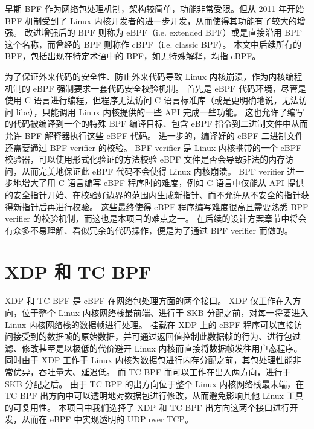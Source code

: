 早期 BPF 作为网络包处理机制，架构较简单，功能非常受限。但从 2011 年开始 BPF 机制受到了 Linux 内核开发者的进一步开发，从而使得其功能有了较大的增强。
改进增强后的 BPF 则称为 eBPF（i.e. extended BPF）或是直接沿用 BPF 这个名称，而曾经的 BPF 则称作 cBPF（i.e. classic BPF）。\cite{10.1145/3371038}
本文中后续所有的 BPF，包括出现在特定术语中的 BPF，如无特殊解释，均指 eBPF。

为了保证外来代码的安全性、防止外来代码导致 Linux 内核崩溃，作为内核编程机制的 eBPF 强制要求一套代码安全校验机制。
首先是 eBPF 代码环境，尽管是使用 C 语言进行编程，但程序无法访问 C 语言标准库（或是更明确地说，无法访问 libc），只能调用 Linux 内核提供的一些 API 完成一些功能。
这也允许了编写的代码被编译到一个的特殊 BPF 编译目标、包含 eBPF 指令到二进制文件中从而允许 BPF 解释器执行这些 eBPF 代码。
进一步的，编译好的 eBPF 二进制文件还需要通过 BPF verifier 的校验。
BPF verifier 是 Linux 内核携带的一个 eBPF 校验器，可以使用形式化验证的方法校验 eBPF 文件是否会导致非法的内存访问，从而完美地保证此 eBPF 代码不会使得 Linux 内核崩溃。
BPF verifier 进一步地增大了用 C 语言编写 eBPF 程序时的难度，例如 C 语言中仅能从 API 提供的安全指针开始、在校验好边界的范围内生成新指针、而不允许从不安全的指针获得新指针后再进行校验。
这些最终使得 eBPF 程序编写难度很高且需要熟悉 BPF verifier 的校验机制，而这也是本项目的难点之一。
在后续的设计方案章节中将会有众多不易理解、看似冗余的代码操作，便是为了通过 BPF verifier 而做的。

\section{XDP 和 TC BPF}

XDP 和 TC BPF 是 eBPF 在网络包处理方面的两个接口。
XDP 仅工作在入方向，位于整个 Linux 内核网络栈最前端、进行于 SKB 分配之前，对每一将要进入 Linux 内核网络栈的数据帧进行处理。
挂载在 XDP 上的 eBPF 程序可以直接访问接受到的数据帧的原始数据，并可通过返回值控制此数据帧的行为、进行包过滤、修改甚至是以极低的代价避开 Linux 内核而直接将数据帧发往用户态程序。
同时由于 XDP 工作于 Linux 内核为数据包进行内存分配之前，其包处理性能非常优异，吞吐量大、延迟低。
而 TC BPF 而可以工作在出入两方向，进行于 SKB 分配之后。
由于 TC BPF 的出方向位于整个 Linux 内核网络栈最末端，在 TC BPF 出方向中可以透明地对数据包进行修改，从而避免影响其他 Linux 工具的可复用性。
本项目中我们选择了 XDP 和 TC BPF 出方向这两个接口进行开发，从而在 eBPF 中实现透明的 UDP over TCP。
